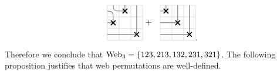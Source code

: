 \begin{align*}
\begin{tikzpicture}[scale=0.5]
        \draw[black!20] (0,0) grid (3,3);
        \Xmarking{1}{2}\Xmarking{2}{3}\Xmarking{3}{1}
        \Asmooth{1}{3}\EAST{2}{1}\EAST{1}{1}\UP{3}{3}\UP{3}{2}
    \end{tikzpicture}
        \begin{tikzpicture}[scale=0.5]
        \draw[white!20] (0,0) grid (1,3);
        \node[text width=0.5cm] at (0.5, 1.5) {$+$};
        \end{tikzpicture}
    \begin{tikzpicture}[scale=0.5]
        \draw[black!20] (0,0) grid (3,3);
        \Xmarking{1}{3}\Xmarking{2}{2}\Xmarking{3}{1}
        \UP{2}{3}\EAST{1}{2}\UP{3}{2}\UP{3}{3}\EAST{1}{1}\EAST{2}{1}
    \end{tikzpicture}.  
  \end{align*}
Therefore we conclude that $\operatorname{Web}_3=\{123, 213, 132, 231, 321\}$.
The following proposition justifies that web permutations are well-defined. 

